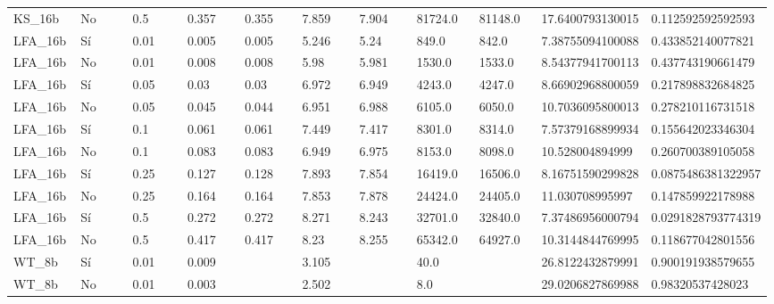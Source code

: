 {{\begin{longtable}{M{0.09\linewidth}M{0.09\linewidth}M{0.09\linewidth}M{0.09\linewidth}M{0.09\linewidth}M{0.09\linewidth}M{0.09\linewidth}M{0.09\linewidth}M{0.09\linewidth}M{0.09\linewidth}M{0.09\linewidth}}
KS\_16b & No & \num{0.5} & \num{0.357} & \num{0.355} & \num{7.859} & \num{7.904} & \num{81724.0} & \num{81148.0} & \num{17.6400793130015} & \num{0.112592592592593} \\
LFA\_16b & Sí & \num{0.01} & \num{0.005} & \num{0.005} & \num{5.246} & \num{5.24} & \num{849.0} & \num{842.0} & \num{7.38755094100088} & \num{0.433852140077821} \\
LFA\_16b & No & \num{0.01} & \num{0.008} & \num{0.008} & \num{5.98} & \num{5.981} & \num{1530.0} & \num{1533.0} & \num{8.54377941700113} & \num{0.437743190661479} \\
LFA\_16b & Sí & \num{0.05} & \num{0.03} & \num{0.03} & \num{6.972} & \num{6.949} & \num{4243.0} & \num{4247.0} & \num{8.66902968800059} & \num{0.217898832684825} \\
LFA\_16b & No & \num{0.05} & \num{0.045} & \num{0.044} & \num{6.951} & \num{6.988} & \num{6105.0} & \num{6050.0} & \num{10.7036095800013} & \num{0.278210116731518} \\
LFA\_16b & Sí & \num{0.1} & \num{0.061} & \num{0.061} & \num{7.449} & \num{7.417} & \num{8301.0} & \num{8314.0} & \num{7.57379168899934} & \num{0.155642023346304} \\
LFA\_16b & No & \num{0.1} & \num{0.083} & \num{0.083} & \num{6.949} & \num{6.975} & \num{8153.0} & \num{8098.0} & \num{10.528004894999} & \num{0.260700389105058} \\
LFA\_16b & Sí & \num{0.25} & \num{0.127} & \num{0.128} & \num{7.893} & \num{7.854} & \num{16419.0} & \num{16506.0} & \num{8.16751590299828} & \num{0.0875486381322957} \\
LFA\_16b & No & \num{0.25} & \num{0.164} & \num{0.164} & \num{7.853} & \num{7.878} & \num{24424.0} & \num{24405.0} & \num{11.030708995997} & \num{0.147859922178988} \\
LFA\_16b & Sí & \num{0.5} & \num{0.272} & \num{0.272} & \num{8.271} & \num{8.243} & \num{32701.0} & \num{32840.0} & \num{7.37486956000794} & \num{0.0291828793774319} \\
LFA\_16b & No & \num{0.5} & \num{0.417} & \num{0.417} & \num{8.23} & \num{8.255} & \num{65342.0} & \num{64927.0} & \num{10.3144844769995} & \num{0.118677042801556} \\
WT\_8b & Sí & \num{0.01} & \num{0.009} &   & \num{3.105} &   & \num{40.0} &   & \num{26.8122432879991} & \num{0.900191938579655} \\
WT\_8b & No & \num{0.01} & \num{0.003} &   & \num{2.502} &   & \num{8.0} &   & \num{29.0206827869988} & \num{0.98320537428023} \\

\end{longtable}}}
